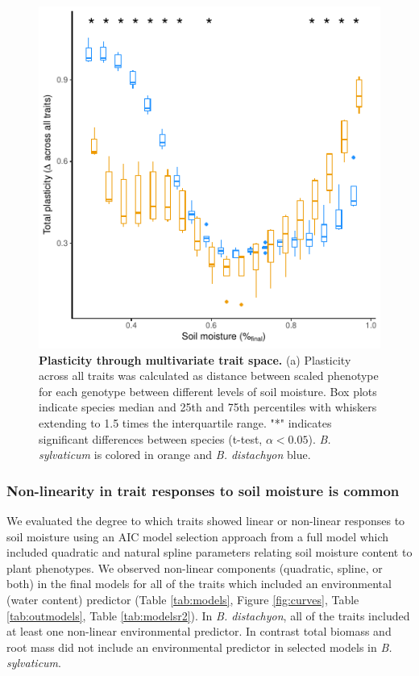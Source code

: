 \documentclass[jou,floatsintext]{apa6}
\begin{document}
\begin{figure}[!h]
\includegraphics[width=\textwidth]{../Figures/multi_plast} \caption{\textbf{Plasticity through multivariate trait space.} (a) Plasticity across all traits was calculated as distance between scaled phenotype for each genotype between different levels of soil moisture. Box plots indicate species median and 25th and 75th percentiles with whiskers extending to 1.5 times the interquartile range. "*" indicates significant differences between species (t-test, \(\alpha < 0.05\)). \emph{B. sylvaticum} is colored in orange and \emph{B. distachyon} blue.}\label{fig:multi}
\end{figure}

\hypertarget{non-linearity-in-trait-responses-to-soil-moisture-is-common}{%
\subsubsection{Non-linearity in trait responses to soil moisture is common}\label{non-linearity-in-trait-responses-to-soil-moisture-is-common}}

We evaluated the degree to which traits showed linear or non-linear responses to soil moisture using an AIC model selection approach from a full model which included quadratic and natural spline parameters relating soil moisture content to plant phenotypes. We observed non-linear components (quadratic, spline, or both) in the final models for all of the traits which included an environmental (water content) predictor (Table \ref{tab:models}, Figure \ref{fig:curves}, Table \ref{tab:outmodels}, Table \ref{tab:modelsr2}). In \emph{B. distachyon}, all of the traits included at least one non-linear environmental predictor. In contrast total biomass and root mass did not include an environmental predictor in selected models in \emph{B. sylvaticum}.
\end{document}
